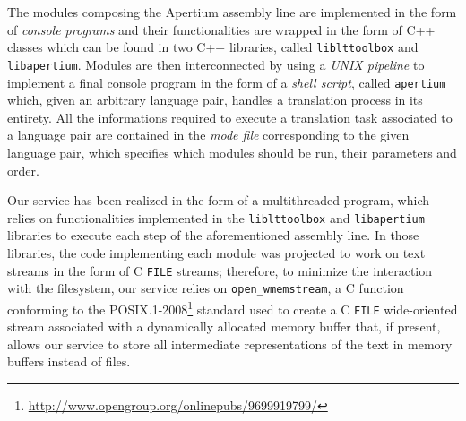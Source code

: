 \documentclass[11pt]{article}
\begin{document}


The modules composing the Apertium assembly line are implemented in the form of \emph{console programs} and their functionalities are wrapped in the form of C++ classes which can be found in two C++ libraries, called {\tt\small liblttoolbox} and {\tt\small libapertium}.
Modules are then interconnected by using a \emph{UNIX pipeline} to implement a final console program in the form of a \emph{shell script}, called {\tt\small apertium} which, given an arbitrary language pair, handles a translation process in its entirety. All the informations required to execute a translation task associated to a language pair are contained in the \emph{mode file} corresponding to the given language pair, which specifies which modules should be run, their parameters and order.

Our service has been realized in the form of a multithreaded program, which relies on functionalities implemented in the {\tt\small liblttoolbox} and {\tt\small libapertium} libraries to execute each step of the aforementioned assembly line. In those libraries, the code implementing each module was projected to work on text streams in the form of C {\small\tt FILE} streams; therefore, to minimize the interaction with the filesystem, our service relies on {\small\tt open\_wmemstream}, a C function conforming to the POSIX.1-2008\footnote{\small\url{http://www.opengroup.org/onlinepubs/9699919799/}} standard used to create a C {\small\tt FILE} wide-oriented stream associated with a dynamically allocated memory buffer that, if present, allows our service to store all intermediate representations of the text in memory buffers instead of files.


\end{document}
